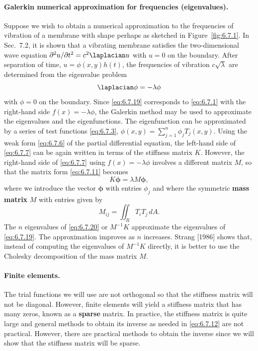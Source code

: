 \paragraph{Galerkin numerical approximation for frequencies (eigenvalues).}
Suppose we wish to obtain a numerical approximation to the frequencies of vibration of a membrane with shape perhaps as sketched in Figure~\ref{fig:6.7.1}.  In Sec.~7.2, it is shown that a vibrating membrane satisfies the two-dimensional wave equation $\partial^2 u/\partial t^2 = c^2\laplacian u$ with $u = 0$ on the boundary.  After separation of time, $u = \phi(x,y)h(t)$, the frequencies of vibration $c\sqrt{\lambda}$ are determined from the eigenvalue problem
\begin{equation}
\laplacian\phi = -\lambda\phi
\label{eq:6.7.19}
\end{equation}
with $\phi = 0$ on the boundary.  Since \eqref{eq:6.7.19} corresponds to \eqref{eq:6.7.1} with the right-hand side $f(x) = -\lambda\phi$, the Galerkin method may be used to approximate the eigenvalues and the eigenfunctions.  The eigenfunction can be approximated by a series of test functions \eqref{eq:6.7.3}, $\phi(x,y) = \sum_{j=1}^{n}\phi_j T_j(x,y)$.  Using the weak form \eqref{eq:6.7.6} of the partial differential equation, the left-hand side of \eqref{eq:6.7.7} can be again written in terms of the stiffness matrix $K$.  However, the right-hand side of \eqref{eq:6.7.7} using $f(x) = -\lambda\phi$ involves a different matrix $M$, so that the matrix form \eqref{eq:6.7.11} becomes
\begin{equation}
K\boldsymbol{\phi} = \lambda M\boldsymbol{\phi},
\label{eq:6.7.20}
\end{equation}
where we introduce the vector $\boldsymbol{\phi}$ with entries $\phi_j$ and where the symmetric \textbf{mass matrix} $M$ with entries given by
\begin{equation}
M_{ij} = \iint_R T_i T_j\,dA.
\label{eq:6.7.21}
\end{equation}
The $n$ eigenvalues of \eqref{eq:6.7.20} or $M^{-1}K$ approximate the eigenvalues of \eqref{eq:6.7.19}.  The approximation improves as $n$ increases.  Strang [1986] shows that, instead of computing the eigenvalues of $M^{-1}K$ directly, it is better to use the Cholesky decomposition of the mass matrix $M$.

\paragraph{Finite elements.}
The trial functions we will use are not orthogonal so that the stiffness matrix will not be diagonal.  However, finite elements will yield a stiffness matrix that has many zeros, known as a \textbf{sparse} matrix.  In practice, the stiffness matrix is quite large and general methods to obtain its inverse as needed in \eqref{eq:6.7.12} are not practical.  However, there are practical methods to obtain the inverse since we will show that the stiffness matrix will be sparse.

